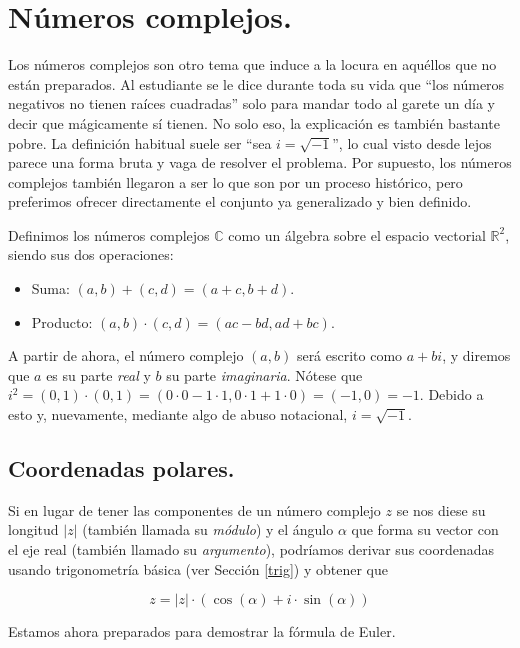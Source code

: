 \section{Números complejos.}

Los números complejos son otro tema que induce a la locura en aquéllos que no están preparados. Al estudiante se le dice durante toda su vida que \enquote{los números negativos no tienen raíces cuadradas} solo para mandar todo al garete un día y decir que mágicamente sí tienen. No solo eso, la explicación es también bastante pobre. La definición habitual suele ser \enquote{sea $i = \sqrt{-1}$}, lo cual visto desde lejos parece una forma bruta y vaga de resolver el problema. Por supuesto, los números complejos también llegaron a ser lo que son por un proceso histórico, pero preferimos ofrecer directamente el conjunto ya generalizado y bien definido.

Definimos los números complejos $\mathbb{C}$ como un álgebra sobre el espacio vectorial $\mathbb{R}^2$, siendo sus dos operaciones:

\begin{itemize}
	\item Suma: $(a, b) + (c, d) = (a + c, b + d)$.
	\item Producto: $(a, b) \cdot (c, d) = (ac - bd, ad + bc)$.
\end{itemize}

A partir de ahora, el número complejo $(a, b)$ será escrito como $a + bi$, y diremos que $a$ es su parte \textit{real} y $b$ su parte \textit{imaginaria}. Nótese que $i^2 = (0, 1) \cdot (0, 1) = (0 \cdot 0 - 1 \cdot 1, 0 \cdot 1 + 1 \cdot 0) = (-1, 0) = -1$. Debido a esto y, nuevamente, mediante algo de abuso notacional, $i = \sqrt{-1}$.

\subsection{Coordenadas polares.}

Si en lugar de tener las componentes de un número complejo $z$ se nos diese su longitud $|z|$ (también llamada su \textit{módulo}) y el ángulo $\alpha$ que forma su vector con el eje real (también llamado su \textit{argumento}), podríamos derivar sus coordenadas usando trigonometría básica (ver Sección \ref{trig}) y obtener que

$$z = |z| \cdot (\cos(\alpha) + i\cdot \sin(\alpha))$$

Estamos ahora preparados para demostrar la fórmula de Euler.

\newpage
